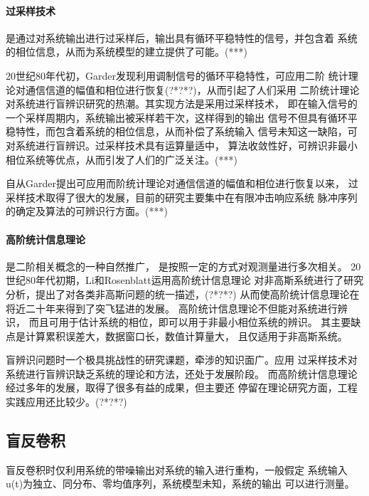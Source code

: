 \paragraph*{过采样技术}
是通过对系统输出进行过采样后，输出具有循环平稳特性的信号，并包含着
系统的相位信息，从而为系统模型的建立提供了可能。(***)

20世纪80年代初，Garder发现利用调制信号的循环平稳特性，可应用二阶
统计理论对通信信道的幅值和相位进行恢复(?*?*?)，从而引起了人们采用
二阶统计理论对系统进行盲辨识研究的热潮。其实现方法是采用过采样技术，
即在输入信号的一个采样周期内，系统输出被采样若干次，这样得到的输出
信号不但具有循环平稳特性，而包含着系统的相位信息，从而补偿了系统输入
信号未知这一缺陷，可对系统进行盲辨识。过采样技术具有运算量适中，
算法收敛性好，可辨识非最小相位系统等优点，从而引发了人们的广泛关注。(***)

自从Garder提出可应用而阶统计理论对通信信道的幅值和相位进行恢复以来，
过采样技术取得了很大的发展，目前的研究主要集中在有限冲击响应系统
脉冲序列的确定及算法的可辨识行方面。(***)

\paragraph*{高阶统计信息理论}是二阶相关概念的一种自然推广，
是按照一定的方式对观测量进行多次相关。
20世纪80年代初期，Li和Rosenblatt运用高阶统计信息理论
对非高斯系统进行了研究分析，提出了对各类非高斯问题的统一描述，(?*?*?) 
从而使高阶统计信息理论在将近二十年来得到了突飞猛进的发展。
高阶统计信息理论不但能对系统进行辨识，
而且可用于估计系统的相位，即可以用于非最小相位系统的辨识。
其主要缺点是计算累积误差大，数据窗口长，数值计算量大，
且仅适用于非高斯系统。

盲辨识问题时一个极具挑战性的研究课题，牵涉的知识面广。应用
过采样技术对系统进行盲辨识缺乏系统的理论和方法，还处于发展阶段。
而高阶统计信息理论经过多年的发展，取得了很多有益的成果，但主要还
停留在理论研究方面，工程实践应用还比较少。(?*?*?)

\subsection{盲反卷积}
盲反卷积时仅利用系统的带噪输出对系统的输入进行重构，一般假定
系统输入u(t)为独立、同分布、零均值序列，系统模型未知，系统的输出
可以进行测量。

